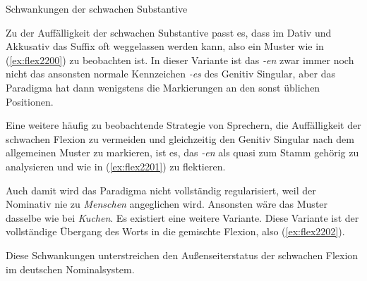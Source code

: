 \begin{Vertiefung}{Schwankungen der schwachen Substantive}
  \label{absref:9w238r467}
  
\noindent Zu der Auffälligkeit der schwachen Substantive passt es, dass im Dativ und Akkusativ das Suffix oft weggelassen werden kann, also ein Muster wie in (\ref{ex:flex2200}) zu beobachten ist.
In dieser Variante ist das \textit{-en} zwar immer noch nicht das ansonsten normale Kennzeichen \textit{-es} des Genitiv Singular, aber das Paradigma hat dann wenigstens die Markierungen an den sonst üblichen Positionen.

\begin{exe}
  \ex\label{ex:flex2200}
  \begin{xlist}
  \end{xlist}
\end{exe}

Eine weitere häufig zu beobachtende Strategie von Sprechern, die Auffälligkeit der schwachen Flexion zu vermeiden und gleichzeitig den Genitiv Singular nach dem allgemeinen Muster zu markieren, ist es, das \textit{-en} als quasi zum Stamm gehörig zu analysieren und wie in (\ref{ex:flex2201}) zu flektieren.

\begin{exe}
  \ex\label{ex:flex2201}
  \begin{xlist}
  \end{xlist}
\end{exe}

Auch damit wird das Paradigma nicht vollständig regularisiert, weil der Nominativ nie zu \Ast\textit{Menschen} angeglichen wird.
Ansonsten wäre das Muster dasselbe wie bei \textit{Kuchen}.
Es existiert eine weitere Variante.
Diese Variante ist der vollständige Übergang des Worts in die gemischte Flexion, also (\ref{ex:flex2202}).

\begin{exe}
  \ex\label{ex:flex2202}
  \begin{xlist}
  \end{xlist}
\end{exe}

Diese Schwankungen unterstreichen den Außenseiterstatus der schwachen Flexion im deutschen Nominalsystem.

\end{Vertiefung}

